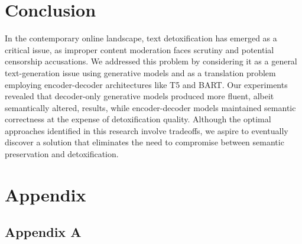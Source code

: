 \documentclass[11pt]{article}
\begin{document}
\section{Conclusion}

In the contemporary online landscape, text detoxification has emerged as a critical issue, as improper content moderation faces scrutiny and potential censorship accusations. We addressed this problem by considering it as a general text-generation issue using generative models and as a translation problem employing encoder-decoder architectures like T5 and BART. Our experiments revealed that decoder-only generative models produced more fluent, albeit semantically altered, results, while encoder-decoder models maintained semantic correctness at the expense of detoxification quality. Although the optimal approaches identified in this research involve tradeoffs, we aspire to eventually discover a solution that eliminates the need to compromise between semantic preservation and detoxification.


\nocite{brown2020language,Ascher2019UnmaskingHO,10.1145/3359294,atwell-etal-2022-appdia,cheng-etal-2020-contextual,app13020726,devlin2019bert,sanh2020distilbert,noauthororeditor,Black2021GPTNeoLS,raffel2020exploring,lewis2019bart,beutel2017data}

\label{sec:Ascher} 
\label{sec:Jhaver}
\label{sec:Gehman}
\label{sec:Brown}
\label{sec:Atwell}
\label{sec:Tegene}
\label{sec:Cheng}
\label{sec:Gong}
\label{sec:Luo}
\label{sec:Lewis}
\label{sec:Raffel}




\clearpage
\appendix

\section{Appendix}
\label{sec:appendix}

\subsection{Appendix A}
\end{document}
